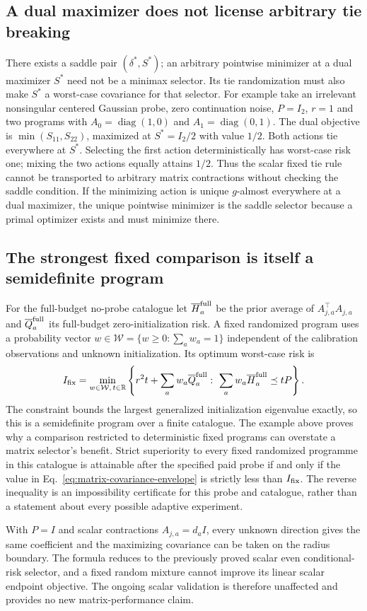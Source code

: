 \subsection{A dual maximizer does not license arbitrary tie breaking}
There exists a saddle pair $(\delta^*,S^*)$; an arbitrary pointwise minimizer at a dual maximizer $S^*$ need not be a minimax selector.
Its tie randomization must also make $S^*$ a worst-case covariance for that selector.
For example take an irrelevant nonsingular centered Gaussian probe, zero continuation noise, $P=I_2$, $r=1$ and two programs with $A_0=\operatorname{diag}(1,0)$ and $A_1=\operatorname{diag}(0,1)$.
The dual objective is $\min(S_{11},S_{22})$, maximized at $S^*=I_2/2$ with value $1/2$.
Both actions tie everywhere at $S^*$.
Selecting the first action deterministically has worst-case risk one; mixing the two actions equally attains $1/2$.
Thus the scalar fixed tie rule cannot be transported to arbitrary matrix contractions without checking the saddle condition.
If the minimizing action is unique $g$-almost everywhere at a dual maximizer, the unique pointwise minimizer is the saddle selector because a primal optimizer exists and must minimize there.

\subsection{The strongest fixed comparison is itself a semidefinite program}
For the full-budget no-probe catalogue let $\overline H_a^{\rm full}$ be the prior average of $A_{j,a}^\top A_{j,a}$ and $\overline Q_a^{\rm full}$ its full-budget zero-initialization risk.
A fixed randomized program uses a probability vector $w\in\mathcal W=\{w\ge0:\sum_aw_a=1\}$ independent of the calibration observations and unknown initialization.
Its optimum worst-case risk is
\begin{equation}
I_{\rm fix}=\min_{w\in\mathcal W,\,t\in\mathbb R}
\left\{r^2t+\sum_aw_a\overline Q_a^{\rm full}:\
\sum_aw_a\overline H_a^{\rm full}\preceq tP\right\}.
\label{eq:matrix-fixed-SDP}
\end{equation}
The constraint bounds the largest generalized initialization eigenvalue exactly, so this is a semidefinite program over a finite catalogue.
The example above proves why a comparison restricted to deterministic fixed programs can overstate a matrix selector's benefit.
Strict superiority to every fixed randomized programme in this catalogue is attainable after the specified paid probe if and only if the value in Eq.~\eqref{eq:matrix-covariance-envelope} is strictly less than $I_{\rm fix}$.
The reverse inequality is an impossibility certificate for this probe and catalogue, rather than a statement about every possible adaptive experiment.

With $P=I$ and scalar contractions $A_{j,a}=d_aI$, every unknown direction gives the same coefficient and the maximizing covariance can be taken on the radius boundary.
The formula reduces to the previously proved scalar even conditional-risk selector, and a fixed random mixture cannot improve its linear scalar endpoint objective.
The ongoing scalar validation is therefore unaffected and provides no new matrix-performance claim.
